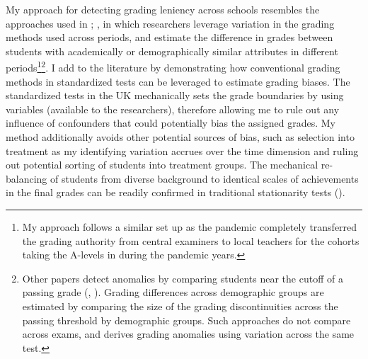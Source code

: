 My approach for detecting grading leniency across schools resembles the approaches used in \cite{neal2008}; \cite{dee2019}, in which researchers leverage variation in the grading methods used across periods, and estimate the difference in grades between students with academically or demographically similar attributes in different periods\footnote{My approach follows a similar set up as the pandemic completely transferred the grading authority from central examiners to local teachers for the cohorts taking the A-levels in during the pandemic years. }\footnote{Other papers detect anomalies by comparing students near the cutoff of a passing grade (\cite{neal2008}, \cite{diamond}). Grading differences across demographic groups are estimated by comparing the size of the grading discontinuities across the passing threshold by demographic groups. Such approaches do not compare across exams, and derives grading anomalies using variation across the same test.}. I add to the literature by demonstrating how conventional grading methods in standardized tests can be leveraged to estimate grading biases. The standardized tests in the UK mechanically sets the grade boundaries by using variables (available to the researchers), therefore allowing me to rule out any influence of confounders that could potentially bias the assigned grades. My method additionally avoids other potential sources of bias, such as selection into treatment as my identifying variation accrues over the time dimension and ruling out potential sorting  of students into treatment groups. The mechanical re-balancing of students from diverse background to identical scales of achievements in the final grades can be readily confirmed in traditional stationarity tests (\cite{https://doi.org/10.3982/ECTA19367}).

\vspace{0.5em}

